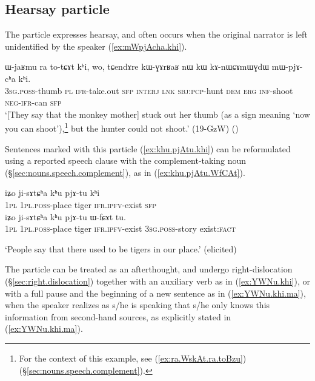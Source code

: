 \subsection{Hearsay particle} \label{sec:fsp.hearsay}
The particle  expresses hearsay, and often occurs when the original narrator is left unidentified by the speaker  (\ref{ex:mWpjAcha.khi}).

\begin{exe}
\ex \label{ex:mWpjAcha.khi}
\gll ɯ-jaʁmu ra to-tɕɤt kʰi, wo, tɕendɤre kɯ-ɣɤrʁaʁ nɯ kɯ kɤ-nɯɕɤmɯɣdɯ mɯ-pjɤ-cʰa kʰi. \\
\textsc{3sg}.\textsc{poss}-thumb \textsc{pl} \textsc{ifr}-take.out \textsc{sfp} \textsc{interj} \textsc{lnk} \textsc{sbj}:\textsc{pcp}-hunt \textsc{dem} \textsc{erg} \textsc{inf}-shoot \textsc{neg}-\textsc{ifr}-can \textsc{sfp} \\
\glt `[They say that the monkey mother] stuck out her thumb (as a sign meaning `now you can shoot'),\footnote{For the context of this example, see (\ref{ex:ra.WskAt.ra.toBzu}) (§\ref{sec:nouns.speech.complement}).} but the hunter could not shoot.' (19-GzW) 	()
\end{exe}

Sentences marked with this particle (\ref{ex:khu.pjAtu.khi}) can be reformulated using a reported speech clause with the complement-taking noun   (§\ref{sec:nouns.speech.complement}), as in (\ref{ex:khu.pjAtu.WfCAt}).

\begin{exe}
\ex 
\begin{xlist}
\ex \label{ex:khu.pjAtu.khi}
\gll iʑo ji-sɤtɕʰa kʰu pjɤ-tu kʰi \\
\textsc{1pl} \textsc{1pl}.\textsc{poss}-place tiger \textsc{ifr}.\textsc{ipfv}-exist \textsc{sfp} \\ 
\ex \label{ex:khu.pjAtu.WfCAt}
\gll iʑo ji-sɤtɕʰa kʰu pjɤ-tu ɯ-fɕɤt tu.\\
\textsc{1pl} \textsc{1pl}.\textsc{poss}-place tiger \textsc{ifr}.\textsc{ipfv}-exist \textsc{3sg}.\textsc{poss}-story exist:\textsc{fact} \\
\end{xlist}
\glt `People say that there used to be tigers in our place.' (elicited)
\end{exe}

The particle  can be treated as an afterthought, and undergo right-dislocation (§\ref{sec:right.dislocation}) together with an auxiliary verb as in (\ref{ex:YWNu.khi}), or with a full pause and the beginning of a new sentence as in (\ref{ex:YWNu.khi.ma}), when the speaker realizes as s/he is speaking that s/he only knows this information from second-hand sources, as explicitly stated in (\ref{ex:YWNu.khi.ma}).


